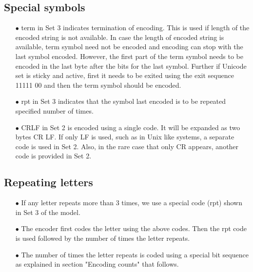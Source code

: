 \documentclass[]{article}
\begin{document}
\subsection{Special symbols}
\begin{itemize}
	\item[$\bullet$] term in Set 3 indicates termination of encoding.  This is used if length of the encoded string is not available.  In case the length of encoded string is available, term symbol need not be encoded and encoding can stop with the last symbol encoded.  However, the first part of the term symbol needs to be encoded in the last byte after the bits for the last symbol.  Further if Unicode set is sticky and active, first it needs to be exited using the exit sequence 11111 00 and then the term symbol should be encoded.
	\item[$\bullet$] rpt in Set 3 indicates that the symbol last encoded is to be repeated specified number of times.
	\item[$\bullet$] CRLF in Set 2 is encoded using a single code. It will be expanded as two bytes CR LF.  If only LF is used, such as in Unix like systems, a separate code is used in Set 2.  Also, in the rare case that only CR appears, another code is provided in Set 2.
\end{itemize}

\subsection{Repeating letters}
\begin{itemize}
	\item[$\bullet$] If any letter repeats more than 3 times, we use a special code (rpt) shown in Set 3 of the model.
	\item[$\bullet$] The encoder first codes the letter using the above codes.  Then the rpt code is used followed by the number of times the letter repeats.
	\item[$\bullet$] The number of times the letter repeats is coded using a special bit sequence as explained in section "Encoding counts" that follows.
\end{itemize}
\end{document}

